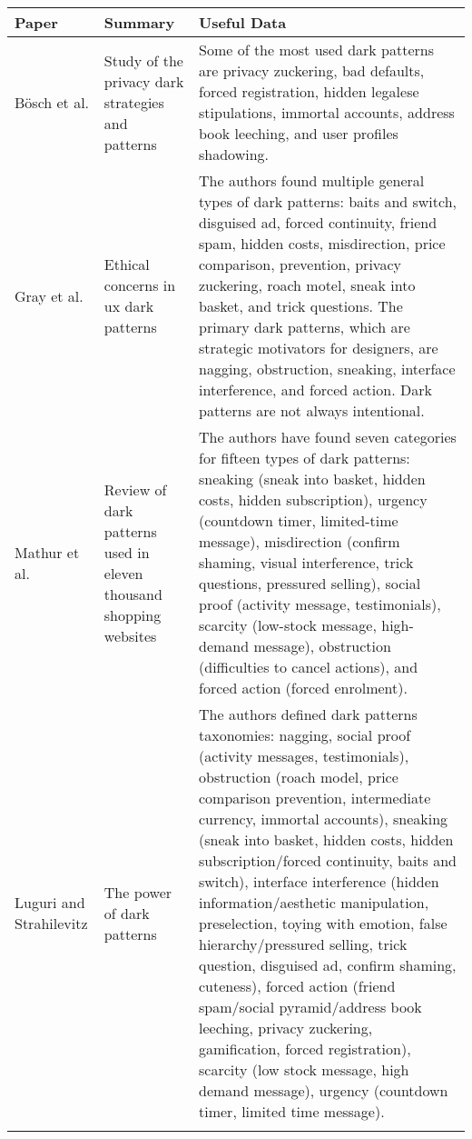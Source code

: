\begin{small}
\begin{landscape}
	\begin{tabularx}{\linewidth}{p{1.5cm}|p{3cm}X}
		\toprule[0.8mm]
		\textbf{Paper} & \textbf{Summary} & \textbf{Useful Data} \\
		\midrule[0.8mm]
		Bösch et al. \cite{bosch_tales_2016} & Study of the privacy dark strategies and patterns & Some of the most used dark patterns are privacy zuckering, bad defaults, forced registration, hidden legalese stipulations, immortal accounts, address book leeching, and user profiles shadowing. \\
		\midrule
		Gray et al. \cite{gray_dark_2018} & Ethical concerns in \gls{ux} dark patterns & The authors found multiple general types of dark patterns: baits and switch, disguised ad, forced continuity, friend spam, hidden costs, misdirection, price comparison, prevention, privacy zuckering, roach motel, sneak into basket, and trick questions. The primary dark patterns, which are strategic motivators for designers, are nagging, obstruction, sneaking, interface interference, and forced action. Dark patterns are not always intentional. \\
		\midrule
		Mathur et al. \cite{mathur_dark_2019} & Review of dark patterns used in eleven thousand shopping websites & The authors have found seven categories for fifteen types of dark patterns: sneaking (sneak into basket, hidden costs, hidden subscription), urgency (countdown timer, limited-time message), misdirection (confirm shaming, visual interference, trick questions, pressured selling), social proof (activity message, testimonials), scarcity (low-stock message, high-demand message), obstruction (difficulties to cancel actions), and forced action (forced enrolment). \\
		\midrule
		Luguri and Strahilevitz \cite{luguri_shining_2021} & The power of dark patterns & The authors defined dark patterns taxonomies: nagging, social proof (activity messages, testimonials), obstruction (roach model, price comparison prevention, intermediate currency, immortal accounts), sneaking (sneak into basket, hidden costs, hidden subscription/forced continuity, baits and switch), interface interference (hidden information/aesthetic manipulation, preselection, toying with emotion, false hierarchy/pressured selling, trick question, disguised ad, confirm shaming, cuteness), forced action (friend spam/social pyramid/address book leeching, privacy zuckering, gamification, forced registration), scarcity (low stock message, high demand message), urgency (countdown timer, limited time message). \\
		\bottomrule[0.8mm]
		\caption{Dark patterns categories comparison}
		\label{table:state_review_results_darkpatterns}
	\end{tabularx} %


\end{landscape}
\end{small}
